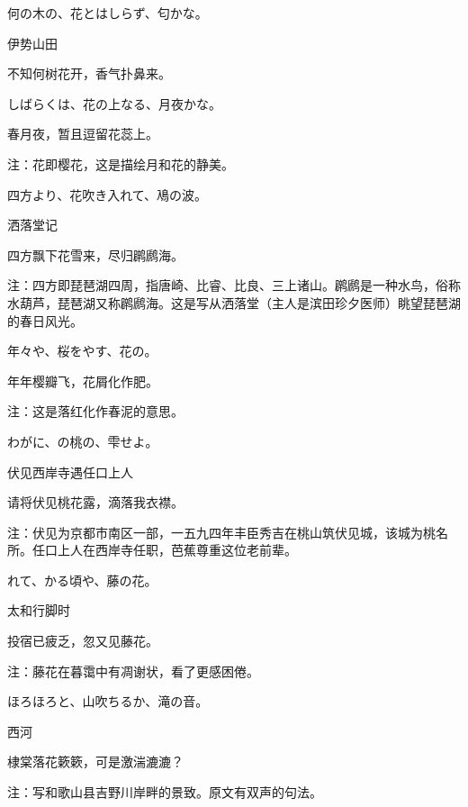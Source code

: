 \begin{haiku}
    {\FH 何の木の、花とはしらず、匂かな。}

    {\FK 伊势山田}

    {\FK 不知何树花开，香气扑鼻来。}
\end{haiku}

\begin{haiku}
    {\FH しばらくは、花の上なる、月夜かな。}

    {\FK 春月夜，暂且逗留花蕊上。}

    {\FT 注：花即樱花，这是描绘月和花的静美。}
\end{haiku}

\begin{haiku}
    {\FH 四方より、花吹き入れて、鳰の波。}

    {\FK 洒落堂记}

    {\FK 四方飘下花雪来，尽归䴙䴘海。}

    {\FT 注：四方即琵琶湖四周，指唐崎、比睿、比良、三上诸山。䴙䴘是一种水鸟，俗称水葫芦，琵琶湖又称䴙䴘海。这是写从洒落堂（主人是滨田珍夕医师）眺望琵琶湖的春日风光。}
\end{haiku}

\begin{haiku}
    {\FH 年々や、桜をやす、花の。}

    {\FK 年年樱瓣飞，花屑化作肥。}

    {\FT 注：这是落红化作春泥的意思。}
\end{haiku}

\begin{haiku}
    {\FH わがに、の桃の、雫せよ。}

    {\FK 伏见西岸寺遇任口上人}

    {\FK 请将伏见桃花露，滴落我衣襟。}

    {\FT 注：伏见为京都市南区一部，一五九四年丰臣秀吉在桃山筑伏见城，该城为桃名所。任口上人在西岸寺任职，芭蕉尊重这位老前辈。}
\end{haiku}

\begin{haiku}
    {\FH {}れて、かる頃や、藤の花。}

    {\FK 太和行脚时}

    {\FK 投宿已疲乏，忽又见藤花。}

    {\FT 注：藤花在暮霭中有凋谢状，看了更感困倦。}
\end{haiku}

\begin{haiku}
    {\FH ほろほろと、山吹ちるか、滝の音。}

    {\FK 西河}

    {\FK 棣棠落花簌簌，可是激湍漉漉？}

    {\FT 注：写和歌山县吉野川岸畔的景致。原文有双声的句法。}
\end{haiku}

